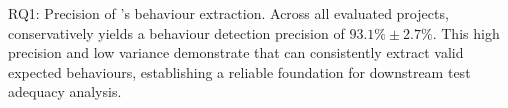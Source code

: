 \begin{rqbox}{RQ1: Precision of \toolname{}'s behaviour extraction.}
Across all evaluated projects, \toolname{} conservatively yields a behaviour detection precision of $93.1\%\pm2.7\%$. 
This high precision and low variance demonstrate that \toolname{} can consistently extract valid expected behaviours, establishing a reliable foundation for downstream test adequacy analysis.
\end{rqbox}

